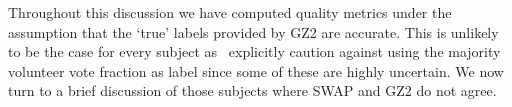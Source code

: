\documentclass[twocolumn]{aastex6}
\newcommand\aastex{AAS\TeX}
\begin{document}
Throughout this discussion we have computed quality metrics under the assumption
that the `true' labels provided by GZ2 are accurate. 
This is unlikely to be the case for every subject as~\cite{Willett2013} explicitly caution against using 
the majority volunteer vote fraction as label since some of these are highly uncertain. 
We now turn to a brief discussion of those subjects where SWAP and GZ2 do not agree. 












\listofchanges
\end{document}
